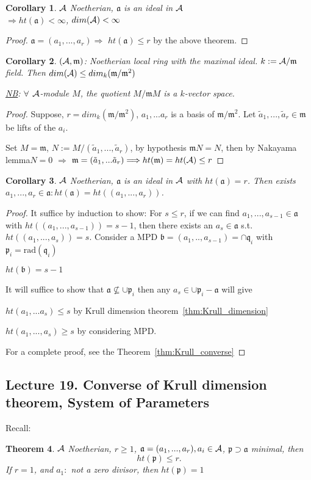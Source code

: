 \documentclass[11pt]{article}
\newtheorem{thm}{Theorem}[section]
\newtheorem{cor}[thm]{Corollary}
\newcommand{\sca}{{\mathfrak a}}
\newcommand{\scb}{{\mathfrak b}}
\newcommand{\scm}{{\mathfrak m}}
\newcommand{\scp}{{\mathfrak p}}
\newcommand{\scq}{\mathfrak q}
\newcommand{\cala}{{\cal A}}
\newcommand{\Lrta}{\Longrightarrow}
\begin{document}
\begin{cor}
$\cala$ Noetherian, $\sca$ is an ideal in $\cala$\\
$\Lrta ht(\sca)<\infty$, $dim(\cala)<\infty$
\end{cor}
\begin{proof}
$\sca=(a_1,...,a_r)\Lrta$ $ht(\sca)\leq r$ by the above theorem.
\end{proof}
\begin{cor}
$(\cala,\scm)$: Noetherian local ring with the maximal ideal. $k:=\cala/\scm$ field. Then $dim(\cala)\leq dim_k(\scm/\scm^2)$

\underline{NB}: $\forall$ $\cala$-module $M$, the quotient $M/\scm M$ is a $k$-vector space.
\end{cor}
\begin{proof}
Suppose, $r=dim_k(\scm/\scm^2)$, $a_1,...a_r$ is a basis of $\scm/\scm^2$. Let $\tilde{a}_1,...,\tilde{a}_r\in\scm$ be lifts of the $a_i$. 

Set $M=\scm$, $N:=M/(\tilde{a}_1,...,\tilde{a}_r)$, by hypothesis $\scm N=N$, then by Nakayama lemma$N=0$ $\Lrta$ $\scm=(\tilde{a}_1,...\tilde{a}_r)\Lrta ht(\scm)=ht(\cala)\leq r$
\end{proof}

\begin{cor}
$\cala$ Noetherian, $\sca$ is an ideal in $\cala$ with $ht(\sca)=r$. Then exists $a_1,...,a_r\in\sca:ht(\sca)=ht((a_1,...,a_r))$.
\end{cor}
\begin{proof}
It suffice by induction to show: For $s\leq r$, if we can find $a_1,...,a_{s-1}\in\sca$ with $ht((a_1,...,a_{s-1}))=s-1$, then there exists an $a_s\in\sca$ s.t. $ht((a_1,...,a_s))=s$.
Consider a MPD $\scb=(a_1,..,a_{s-1})=\cap\scq_i$ with $\scp_i=\text{rad}(\scq_i)$

$ht(\scb)=s-1$

It will suffice to show that $\sca\not\subseteq \cup\scp_i $
then any $a_s\in\cup \scp_i-\sca$ will give 

$ht(a_1,...a_s)\leq s$ by Krull dimension theorem~\ref{thm:Krull_dimension}

$ht(a_1,...,a_s)\geq s$ by considering MPD.

For a complete proof, see the Theorem~\ref{thm:Krull_converse}
\end{proof}



\subsection{Lecture 19. Converse of Krull dimension theorem, System of Parameters}
Recall: 
\begin{thm}\label{thm:thm0}
$\cala$ Noetherian, $r\geq 1$, $\sca=(a_1,...,a_r), a_i\in\cala$, $\scp\supset \sca$ minimal, then 
$$
ht(\scp)\leq r.
$$
If $r=1$, and $a_1:$ not a zero divisor, then $ht(\scp)=1$
\end{thm}
\end{document}
